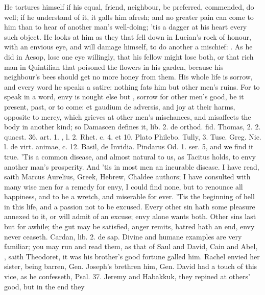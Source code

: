 {{He tortures himself if his equal, friend, neighbour, be preferred,
commended, do well; if he understand of it, it galls him afresh; and no
greater pain can come to him than to hear of another man's well-doing;
'tis a dagger at his heart every such object. He looks at him as they
that fell down in Lucian's rock of honour, with an envious eye, and
will damage himself, to do another a mischief: . As he did in Aesop, lose one eye willingly, that his
fellow might lose both, or that rich man in Quintilian that
poisoned the flowers in his garden, because his neighbour's bees should
get no more honey from them. His whole life is sorrow, and every word
he speaks a satire: nothing fats him but other men's ruins. For to
speak in a word, envy is nought else but ,
sorrow for other men's good, be it present, past, or to come: et
gaudium de adversis, and joy at their harms, opposite to mercy,
which grieves at other men's mischances, and misaffects the body
in another kind; so Damascen defines it, \textlatin{lib. 2. de orthod. fid.
Thomas, 2. 2. quaest. 36. art. 1. \Aristotle, l. 2. Rhet. c. 4. et 10.
Plato Philebo. Tully, 3. Tusc. Greg. Nic. l. de virt. animae, c. 12.
Basil, de Invidia. Pindarus Od. 1. ser. 5}, and we find it true. 'Tis a
common disease, and almost natural to us, as Tacitus holds, to
envy another man's prosperity. And 'tis in most men an incurable
disease. I have read, saith Marcus Aurelius, Greek, Hebrew,
Chaldee authors; I have consulted with many wise men for a remedy for
envy, I could find none, but to renounce all happiness, and to be a
wretch, and miserable for ever. 'Tis the beginning of hell in this
life, and a passion not to be excused. Every other sin hath some
pleasure annexed to it, or will admit of an excuse; envy alone wants
both. Other sins last but for awhile; the gut may be satisfied, anger
remits, hatred hath an end, envy never ceaseth. Cardan, lib. 2. de sap.
Divine and humane examples are very familiar; you may run and read
them, as that of Saul and David, Cain and Abel, , saith Theodoret, it was his
brother's good fortune galled him. Rachel envied her sister, being
barren, Gen.  Joseph's brethren him, Gen.  David had a touch
of this vice, as he confesseth, Psal. 37. Jeremy and
Habakkuk, they repined at others' good, but in the end they
}}
